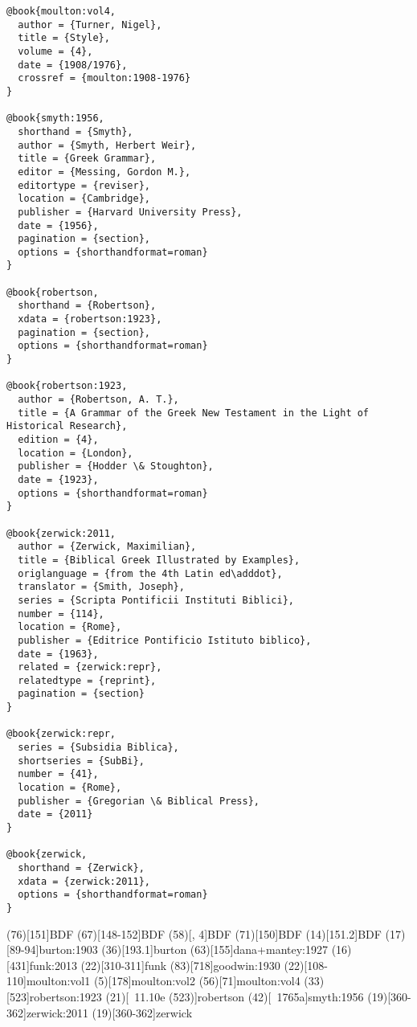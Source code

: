 \documentclass[a4paper]{article}
\begin{document}
\begin{verbatim}
@book{moulton:vol4,
  author = {Turner, Nigel},
  title = {Style},
  volume = {4},
  date = {1908/1976},
  crossref = {moulton:1908-1976}
}

@book{smyth:1956,
  shorthand = {Smyth},
  author = {Smyth, Herbert Weir},
  title = {Greek Grammar},
  editor = {Messing, Gordon M.},
  editortype = {reviser},
  location = {Cambridge},
  publisher = {Harvard University Press},
  date = {1956},
  pagination = {section},
  options = {shorthandformat=roman}
}

@book{robertson,
  shorthand = {Robertson},
  xdata = {robertson:1923},
  pagination = {section},
  options = {shorthandformat=roman}
}

@book{robertson:1923,
  author = {Robertson, A. T.},
  title = {A Grammar of the Greek New Testament in the Light of Historical Research},
  edition = {4},
  location = {London},
  publisher = {Hodder \& Stoughton},
  date = {1923},
  options = {shorthandformat=roman}
}

@book{zerwick:2011,
  author = {Zerwick, Maximilian},
  title = {Biblical Greek Illustrated by Examples},
  origlanguage = {from the 4th Latin ed\adddot},
  translator = {Smith, Joseph},
  series = {Scripta Pontificii Instituti Biblici},
  number = {114},
  location = {Rome},
  publisher = {Editrice Pontificio Istituto biblico},
  date = {1963},
  related = {zerwick:repr},
  relatedtype = {reprint},
  pagination = {section}
}

@book{zerwick:repr,
  series = {Subsidia Biblica},
  shortseries = {SubBi},
  number = {41},
  location = {Rome},
  publisher = {Gregorian \& Biblical Press},
  date = {2011}
}

@book{zerwick,
  shorthand = {Zerwick},
  xdata = {zerwick:2011},
  options = {shorthandformat=roman}
}
\end{verbatim}

\examplecite(76)[151]{BDF}
\examplecite(67)[148-152]{BDF}
\examplecite(58)[, 4]{BDF}
\examplecite(71)[150]{BDF}
\examplecite(14)[151.2]{BDF}
\examplecite(17)[89-94]{burton:1903}
\examplecite(36)[193.1]{burton}
\examplecite(63)[155]{dana+mantey:1927}
\examplecite(16)[431]{funk:2013}
\examplecite(22)[310-311]{funk}
\examplecite(83)[718]{goodwin:1930}
\examplecite(22)[108-110]{moulton:vol1}
\examplecite[afull](5)[178]{moulton:vol2}
\examplecite[afull](56)[71]{moulton:vol4}
\examplecite(33)[523]{robertson:1923}
\examplecite(21)[\pno 11.10e \mkbibparens{523}]{robertson}
\examplecite(42)[\pno 1765a]{smyth:1956}
\examplecite(19)[360-362]{zerwick:2011}
\examplecite(19)[360-362]{zerwick}
\exampleabbreviations
\examplebibliography
\end{document}
